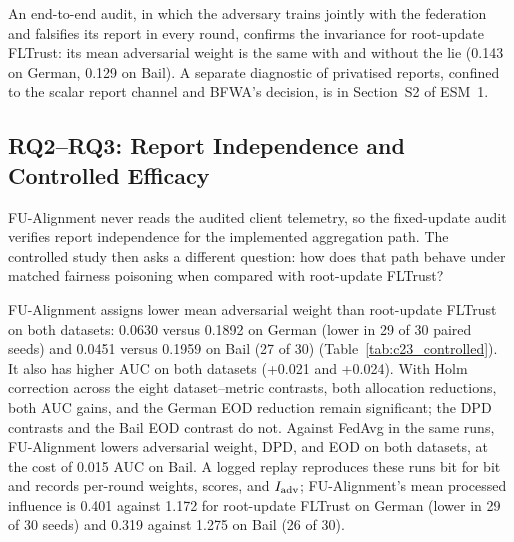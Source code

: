 An end-to-end audit, in which the adversary trains jointly with the federation and falsifies its report in every round, confirms the invariance for root-update FLTrust: its mean adversarial weight is the same with and without the lie (0.143 on German, 0.129 on Bail). A separate diagnostic of privatised reports, confined to the scalar report channel and BFWA's decision, is in Section~S2 of ESM~1.

\subsection{RQ2--RQ3: Report Independence and Controlled Efficacy}
\label{subsec:rq2_rq3_efficacy}

FU-Alignment never reads the audited client telemetry, so the fixed-update audit verifies report independence for the implemented aggregation path. The controlled study then asks a different question: how does that path behave under matched fairness poisoning when compared with root-update FLTrust?



FU-Alignment assigns lower mean adversarial weight than root-update FLTrust on both datasets: 0.0630 versus 0.1892 on German (lower in 29 of 30 paired seeds) and 0.0451 versus 0.1959 on Bail (27 of 30) (Table~\ref{tab:c23_controlled}). It also has higher AUC on both datasets (+0.021 and +0.024). With Holm correction across the eight dataset--metric contrasts, both allocation reductions, both AUC gains, and the German EOD reduction remain significant; the DPD contrasts and the Bail EOD contrast do not. Against FedAvg in the same runs, FU-Alignment lowers adversarial weight, DPD, and EOD on both datasets, at the cost of 0.015 AUC on Bail. A logged replay reproduces these runs bit for bit and records per-round weights, scores, and $I_{\rm adv}$; FU-Alignment's mean processed influence is 0.401 against 1.172 for root-update FLTrust on German (lower in 29 of 30 seeds) and 0.319 against 1.275 on Bail (26 of 30).



